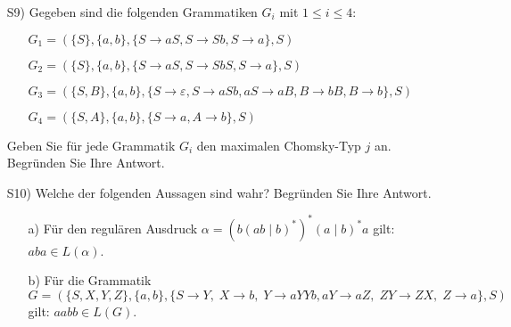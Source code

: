 \begin{exercise}
\begin{enumerate}
\item[S9)] Gegeben sind die folgenden Grammatiken $G_i$ mit $1\le i\le 4$:
    \begin{itemize}
      \item[] $G_1=(\{S\},\{a,b\},\{S\rightarrow aS,S\rightarrow Sb,S\rightarrow a\},S)$
      \item[] $G_2=(\{S\},\{a,b\},\{S\rightarrow aS,S\rightarrow SbS,S\rightarrow a\},S)$
      \item[] $G_3=(\{S,B\},\{a,b\},\{S\rightarrow \varepsilon,S\rightarrow aSb,aS\rightarrow aB, B\rightarrow bB, B\rightarrow b\},S)$
      \item[] $G_4=(\{S,A\},\{a,b\},\{S\rightarrow a,A\rightarrow b\},S)$
    \end{itemize}
   Geben Sie f\"ur jede Grammatik $G_i$ den maximalen Chomsky-Typ $j$ an. Begr\"unden Sie Ihre Antwort.
\item[S10)] Welche der folgenden Aussagen sind wahr? Begr\"unden Sie Ihre Antwort.
   \begin{enumerate}
       \item[a)] F\"ur den regul\"aren Ausdruck $\alpha = (b(ab\mid b)^*)^*(a\mid b)^*a$ gilt: $aba \in L(\alpha)$.
       \item[b)] F\"ur die Grammatik $G=(\{S,X,Y,Z\},\{a,b\},\{S\rightarrow
         Y,\;X\rightarrow b,\;Y\rightarrow
         aYYb,aY\rightarrow aZ,\;ZY\rightarrow ZX,\;Z\rightarrow a\},S)$ gilt: $aabb\in L(G)$.
   \end{enumerate}
 \end{enumerate}
\end{exercise}
